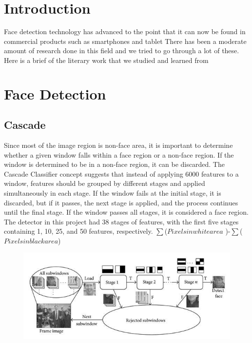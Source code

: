 \section{Introduction}
Face detection technology has advanced to the point that it can now be found in commercial products such as smartphones and tablet
There has been a moderate amount of research done in this field and we tried to go
through a lot of these. Here is a brief of the literary work that we studied and learned from

\section{Face Detection}
\subsection{Cascade}
Since most of the image region is non-face area, it is important to determine whether a given window falls within a face region or a non-face region. If the window is determined to be in a non-face region, it can be discarded. The Cascade Classifier concept suggests that instead of applying 6000 features to a window, features should be grouped by different stages and applied simultaneously in each stage. If the window fails at the initial stage, it is discarded, but if it passes, the next stage is applied, and the process continues until the final stage. If the window passes all stages, it is considered a face region. The detector in this project had 38 stages of features, with the first five stages containing 1, 10, 25, and 50 features, respectively.
\newline  
$  \sum $($Pixels in white area$ )-$\sum$($Pixels in black area$)
\begin{figure}[!htb]
    \centering
    \includegraphics[width=\linewidth,height=0.201\linewidth]{Figures/Ch01/cascade.png}
    \label{figure:cascade}
    \end{figure}
\clearpage

